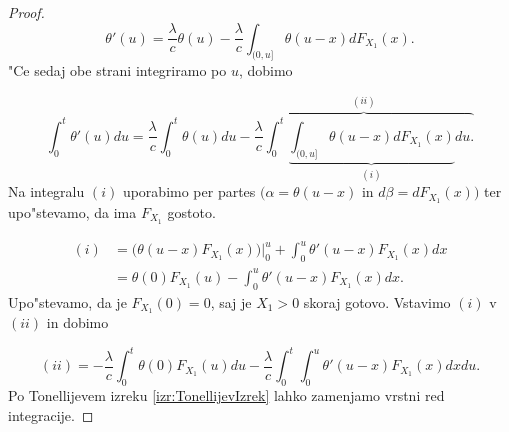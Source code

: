 \documentclass[12pt, a4paper, reqno]{amsart}
\theoremstyle{definition}
\theoremstyle{plain}
\newcommand{\1}{\mathds{1}}
\newcommand*{\refPriloga}[1]{%
  \begingroup
    \hypersetup{
      linkcolor=red,
      linkbordercolor=red,
    }%
    \ref{#1}%
  \endgroup
}
\begin{document}
\begin{proof}
        \begin{equation*}
            \theta'(u) = \frac{\lambda}{c}\theta(u) - \frac{\lambda}{c}\int_{(0, u]}\theta(u - x)dF_{X_1}(x).
        \end{equation*}
        "Ce sedaj obe strani integriramo po $u$, dobimo
        
        \begin{equation}
            \int_0^t\theta'(u)du = \frac{\lambda}{c}\int_0^t\theta(u)du - \overbrace{\frac{\lambda}{c}\int_0^t\underbrace{\int_{(0, u]}\theta(u - x)dF_{X_1}(x)}_{(i)}du.}^{(ii)} 
            \label{eq:verjetnostPrezivetjaIntegral}
        \end{equation}
        Na integralu $(i)$ uporabimo per partes $\bigl(\alpha = \theta(u-x)$ in $d\beta = dF_{X_1}(x)\bigr)$ 
        ter upo"stevamo, da ima $F_{X_1}$ gostoto.

        \begin{align*}
            (i)     &= \bigl(\theta(u - x)F_{X_1}(x)\bigr)\Big|_{0}^{u} + \int_0^u\theta'(u - x)F_{X_1}(x)dx \\
                    &= \theta(0)F_{X_1}(u) - \int_0^u\theta'(u - x)F_{X_1}(x)dx.
        \end{align*}
        Upo"stevamo, da je $F_{X_1}(0) = 0$, saj je $X_1 > 0$ skoraj gotovo. Vstavimo $(i)$ 
        v $(ii)$ in dobimo

        \begin{equation*}
            (ii) =  - \frac{\lambda}{c}\int_0^t\theta(0)F_{X_1}(u)du - \frac{\lambda}{c}\int_0^t\int_0^u\theta'(u - x)F_{X_1}(x)dxdu. 
        \end{equation*}
        Po Tonellijevem izreku \refPriloga{izr:TonellijevIzrek} lahko zamenjamo vrstni red integracije.


\end{proof}
\end{document}
